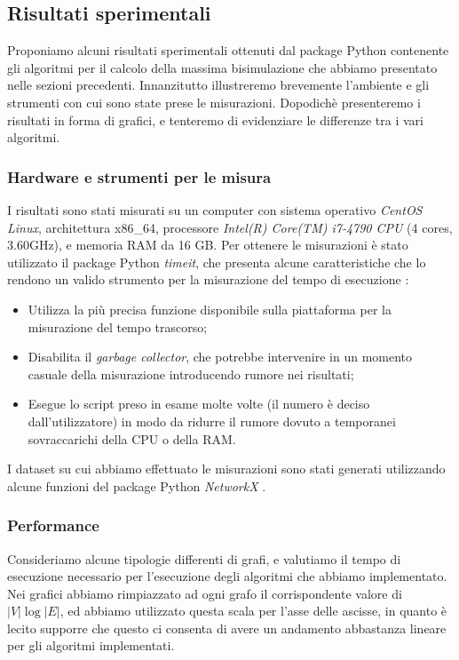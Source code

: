 \subsection{Risultati sperimentali}
Proponiamo alcuni risultati sperimentali ottenuti dal package Python contenente gli algoritmi per il calcolo della massima bisimulazione che abbiamo presentato nelle sezioni precedenti. Innanzitutto illustreremo brevemente l'ambiente e gli strumenti con cui sono state prese le misurazioni. Dopodichè presenteremo i risultati in forma di grafici, e tenteremo di evidenziare le differenze tra i vari algoritmi.

\subsubsection{Hardware e strumenti per le misura}
I risultati sono stati misurati su un computer con sistema operativo \emph{CentOS Linux}, architettura x86\_64, processore \emph{Intel(R) Core(TM) i7-4790 CPU} (4 cores, 3.60GHz), e memoria RAM da 16 GB. Per ottenere le misurazioni è stato utilizzato il package Python \emph{timeit}, che presenta alcune caratteristiche che lo rendono un valido strumento per la misurazione del tempo di esecuzione \cite{pythondocs}:
\begin{itemize}
    \item Utilizza la più precisa funzione disponibile sulla piattaforma per la misurazione del tempo trascorso;
    \item Disabilita il \emph{garbage collector}, che potrebbe intervenire in un momento casuale della misurazione introducendo rumore nei risultati;
    \item Esegue lo script preso in esame molte volte (il numero è deciso dall'utilizzatore) in modo da ridurre il rumore dovuto a temporanei sovraccarichi della CPU o della RAM.
\end{itemize}

I dataset su cui abbiamo effettuato le misurazioni sono stati generati utilizzando alcune funzioni del package Python \emph{NetworkX} \cite{networkx}.

\subsubsection{Performance}
Consideriamo alcune tipologie differenti di grafi, e valutiamo il tempo di esecuzione necessario per l'esecuzione degli algoritmi che abbiamo implementato. Nei grafici abbiamo rimpiazzato ad ogni grafo il corrispondente valore di $|V| \log |E|$, ed abbiamo utilizzato questa scala per l'asse delle ascisse, in quanto è lecito supporre che questo ci consenta di avere un andamento abbastanza lineare per gli algoritmi implementati.

